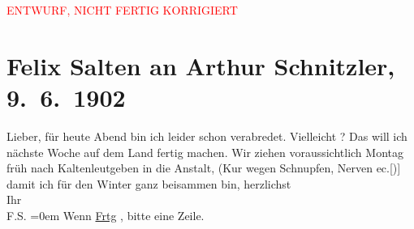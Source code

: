 
\begin{center}
            \textcolor{red}{ENTWURF, NICHT FERTIG KORRIGIERT}
                      \end{center}
            
         \renewcommand{\erwaehnteOrte}{Orte: Kaltenleutgeben, Kaltwasserheilanstalt Winternitz, Wien}
         \renewcommand{\erwaehnteWerke}{}
               \section[Felix Salten an Arthur Schnitzler, 9. 6. 1902]{ Felix Salten an Arthur Schnitzler, 9. 6. 1902}\nopagebreak{}\rehead{ }\begin{ledgroupsized}[t]{13cm}\normalsize\beginnumbering \toendnotes[C]{\smallbreak\pagebreak[2]} 
\toendnotes[C]{\smallbreak}\pstart
           \noindent{}{\pb}Lieber, für heute Abend bin ich leider schon verabredet. Vielleicht
                  \label{K_L03332-1v}\label{K_L03332-1h}? Das \label{K_L03332-11v}\label{K_L03332-11h} will ich nächste Woche auf dem Land fertig
               machen.\pend
           \pstart
           Wir ziehen voraussichtlich Montag früh nach Kaltenleutgeben in die Anstalt, (Kur wegen
               Schnupfen, Nerven ec.{[}){]} damit ich für den Winter ganz {\pb}beisammen bin, \pend
           \pstart
           herzlichst {\\[\baselineskip]}Ihr {\\[\baselineskip]}\spacefill\mbox{F.S.}\pend
           \leftskip=0em{}\pstart
           \noindent{}Wenn \uline{Frtg}{ }, bitte eine Zeile. \pend
           
         
         \endnumbering{}\end{ledgroupsized}\begin{anhang}\end{anhang}\newcommand{\dateiname}{L03332}\newcommand{\titel}{Felix Salten an Arthur Schnitzler, 9. 6. 1902}\newcommand{\editorInnen}{Martin Anton Müller und Laura Untner}
      